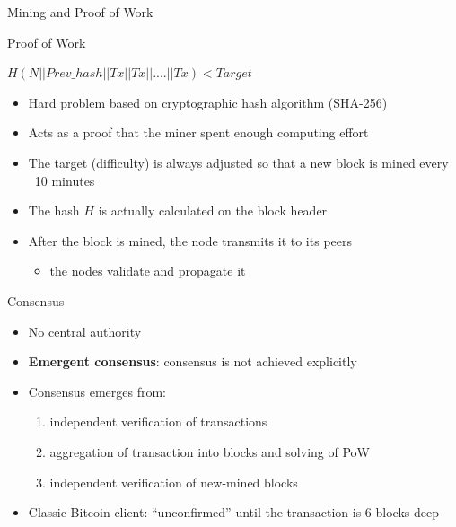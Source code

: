 \documentclass{beamer}
\begin{document}
  \begin{frame}{Mining and Proof of Work}
      \begin{block}{Proof of Work}
      \begin{center}
          $H(N||Prev\_hash||Tx||Tx||....||Tx)<Target$
      \end{center}
        \begin{itemize}
            \item Hard problem based on cryptographic hash algorithm (SHA-256)
            \item Acts as a proof that the miner spent enough computing effort
            \item The target (difficulty) is always adjusted so that a new block is mined every ~10 minutes
            \item The hash $H$ is actually calculated on the block header
            \item After the block is mined, the node transmits it to its peers
            \begin{itemize}
                \item[\MVRightarrow] the nodes validate and propagate it
            \end{itemize}
        \end{itemize}
      \end{block}
  \end{frame}
  
  
  
  \begin{frame}{Consensus}
    \begin{itemize}
        \item No central authority
        \item \textbf{Emergent consensus}: consensus is not achieved explicitly
        \item Consensus emerges from:
        \begin{enumerate}
            \item independent verification of transactions
            \item aggregation of transaction into blocks and solving of PoW
            \item independent verification of new-mined blocks
        \end{enumerate}
        \item Classic Bitcoin client:  ``unconfirmed'' until the transaction is 6 blocks deep
    \end{itemize}
  \end{frame}
  
\end{document}
